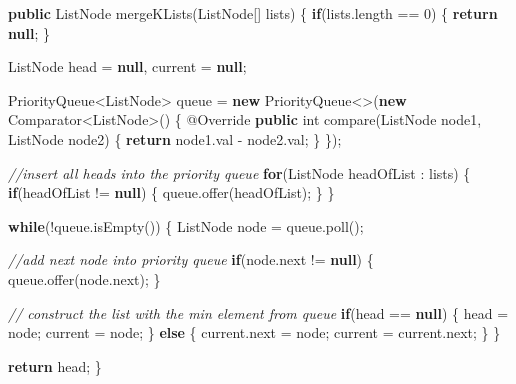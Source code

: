 \documentclass[]{book}
\newenvironment{Shaded}{\begin{snugshade}}{\end{snugshade}}
\newcommand{\AttributeTok}[1]{\textcolor[rgb]{0.77,0.63,0.00}{#1}}
\newcommand{\BuiltInTok}[1]{#1}
\newcommand{\CommentTok}[1]{\textcolor[rgb]{0.56,0.35,0.01}{\textit{#1}}}
\newcommand{\DataTypeTok}[1]{\textcolor[rgb]{0.13,0.29,0.53}{#1}}
\newcommand{\DecValTok}[1]{\textcolor[rgb]{0.00,0.00,0.81}{#1}}
\newcommand{\FunctionTok}[1]{\textcolor[rgb]{0.00,0.00,0.00}{#1}}
\newcommand{\KeywordTok}[1]{\textcolor[rgb]{0.13,0.29,0.53}{\textbf{#1}}}
\newcommand{\NormalTok}[1]{#1}
\begin{document}
\begin{Shaded}
\begin{Highlighting}[]
\KeywordTok{public}\NormalTok{ ListNode }\FunctionTok{mergeKLists}\NormalTok{(ListNode[] lists) \{}
    \KeywordTok{if}\NormalTok{(lists.}\FunctionTok{length}\NormalTok{ == }\DecValTok{0}\NormalTok{) \{}
        \KeywordTok{return} \KeywordTok{null}\NormalTok{;}
\NormalTok{    \}}

\NormalTok{    ListNode head = }\KeywordTok{null}\NormalTok{, current = }\KeywordTok{null}\NormalTok{;}

    \BuiltInTok{PriorityQueue}\NormalTok{<ListNode> queue = }\KeywordTok{new} \BuiltInTok{PriorityQueue}\NormalTok{<>(}\KeywordTok{new} \BuiltInTok{Comparator}\NormalTok{<ListNode>() \{}
        \AttributeTok{@Override}
        \KeywordTok{public} \DataTypeTok{int} \FunctionTok{compare}\NormalTok{(ListNode node1, ListNode node2) \{}
            \KeywordTok{return}\NormalTok{ node1.}\FunctionTok{val}\NormalTok{ - node2.}\FunctionTok{val}\NormalTok{;}
\NormalTok{        \}}
\NormalTok{    \});}

    \CommentTok{//insert all heads into the priority queue}
    \KeywordTok{for}\NormalTok{(ListNode headOfList : lists) \{}
        \KeywordTok{if}\NormalTok{(headOfList != }\KeywordTok{null}\NormalTok{) \{}
\NormalTok{            queue.}\FunctionTok{offer}\NormalTok{(headOfList);}
\NormalTok{        \}}
\NormalTok{    \}}


    \KeywordTok{while}\NormalTok{(!queue.}\FunctionTok{isEmpty}\NormalTok{()) \{}
\NormalTok{        ListNode node = queue.}\FunctionTok{poll}\NormalTok{();}

        \CommentTok{//add next node into priority queue}
        \KeywordTok{if}\NormalTok{(node.}\FunctionTok{next}\NormalTok{ != }\KeywordTok{null}\NormalTok{) \{}
\NormalTok{            queue.}\FunctionTok{offer}\NormalTok{(node.}\FunctionTok{next}\NormalTok{);}
\NormalTok{        \}}

        \CommentTok{// construct the list with the min element from queue}
        \KeywordTok{if}\NormalTok{(head == }\KeywordTok{null}\NormalTok{) \{}
\NormalTok{            head = node;}
\NormalTok{            current = node;}
\NormalTok{        \} }\KeywordTok{else}\NormalTok{ \{}
\NormalTok{            current.}\FunctionTok{next}\NormalTok{ = node;}
\NormalTok{            current = current.}\FunctionTok{next}\NormalTok{;}
\NormalTok{        \}}
\NormalTok{    \}}

    \KeywordTok{return}\NormalTok{ head;}
\NormalTok{\}}
\end{Highlighting}
\end{Shaded}
\end{document}

